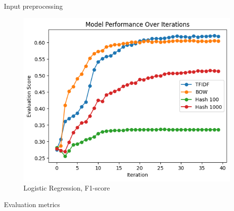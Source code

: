 \documentclass{beamer}
\begin{document}
\begin{frame}[t]{Input preprocessing}
\vspace{-3mm}
\begin{figure}[h]
	\caption{Logistic Regression, F1-score}
	\centering
	\includegraphics[width=0.73\linewidth]{images/LogisticRegression/f1score_compare_inprep.png}
\end{figure}
\end{frame}


\begin{frame}[t]{Evaluation metrics}
\end{frame}	
\end{document}
